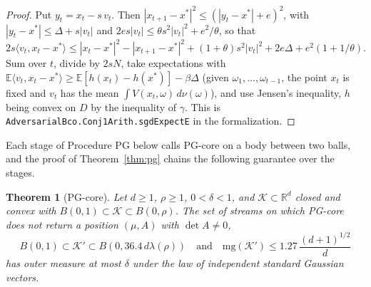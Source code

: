 \documentclass[11pt]{amsart}
\newtheorem{theorem}{Theorem}[section]
\theoremstyle{definition}
\numberwithin{equation}{section}
\newcommand{\R}{\mathbb{R}}
\newcommand{\E}{\mathbb{E}}
\newcommand{\cK}{\mathcal{K}}
\newcommand{\ip}[1]{\langle #1\rangle}
\begin{document}
\begin{proof}
Put $y_t=x_t-s\,v_t$. Then $|x_{t+1}-x^*|^2\le(|y_t-x^*|+e)^2$, with $|y_t-x^*|\le\Delta+s|v_t|$ and $2es|v_t|\le\theta s^2|v_t|^2+e^2/\theta$, so that
\[
2s\ip{v_t,x_t-x^*}\le|x_t-x^*|^2-|x_{t+1}-x^*|^2+(1+\theta)s^2|v_t|^2+2e\Delta+e^2(1+1/\theta).
\]
Sum over $t$, divide by $2sN$, take expectations with $\E\ip{v_t,x_t-x^*}\ge\E[h(x_t)-h(x^*)]-\beta\Delta$ (given $\omega_1,\dots,\omega_{t-1}$, the point $x_t$ is fixed and $v_t$ has the mean $\int V(x_t,\omega)\,d\nu(\omega)$), and use Jensen's inequality, $h$ being convex on $D$ by the inequality of $\gamma$.
This is \texttt{AdversarialBco.Conj1Arith.sgdExpectE} in the formalization.
\end{proof}

Each stage of Procedure PG below calls PG-core on a body between two balls, and the proof of Theorem~\ref{thm:pg} chains the following guarantee over the stages.

\begin{theorem}[PG-core]\label{thm:pgcore}
Let $d\ge1$, $\rho\ge1$, $0<\delta<1$, and $\cK\subset\R^d$ closed and convex with $B(0,1)\subset\cK\subset B(0,\rho)$. The set of streams on which PG-core does not return a position $(\mu,A)$ with $\det A\ne0$,
\[
B(0,1)\subset\cK'\subset B(0,36.4\,d\lambda(\rho))\quad\text{and}\quad \mathrm{mg}(\cK')\le1.27\,\frac{(d+1)^{1/2}}d
\]
has outer measure at most $\delta$ under the law of independent standard Gaussian vectors.
\end{theorem}
\end{document}
